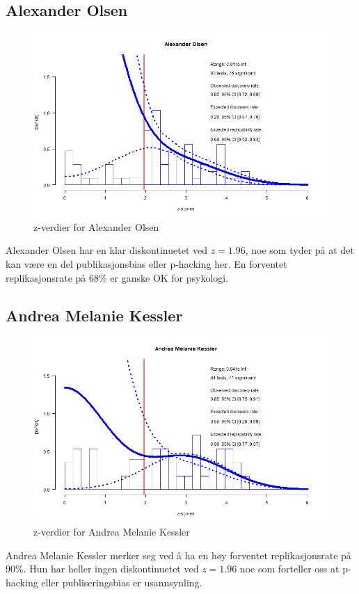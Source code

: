 \documentclass[doc,norsk]{apa7}
\begin{document}
\subsection{Alexander Olsen}
\begin{figure}[h!]
    \centering
    \includegraphics[width=\textwidth]{images/Alexander Olsen.png}
    \caption{z-verdier for Alexander Olsen}
\end{figure}
Alexander Olsen har en klar diskontinuetet ved $z=1.96$, noe som tyder på at det kan være en del publikasjonsbias eller p-hacking her. En forventet replikasjonsrate på 68\% er ganske OK for psykologi.

\subsection{Andrea Melanie Kessler}
\begin{figure}[h!]
    \centering
    \includegraphics[width=\textwidth]{images/Andrea Melanie Kessler.png}
    \caption{z-verdier for Andrea Melanie Kessler}
\end{figure}
Andrea Melanie Kessler merker seg ved å ha en høy forventet replikasjonsrate på 90\%. Hun har heller ingen diskontinuetet ved $z=1.96$ noe som forteller oss at p-hacking eller publiseringsbias er usannsynling.
\end{document}
